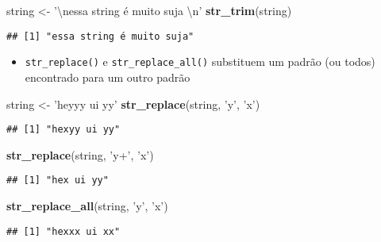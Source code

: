 \documentclass[]{book}
\newenvironment{Shaded}{\begin{snugshade}}{\end{snugshade}}
\newcommand{\KeywordTok}[1]{\textcolor[rgb]{0.13,0.29,0.53}{\textbf{{#1}}}}
\newcommand{\CharTok}[1]{\textcolor[rgb]{0.31,0.60,0.02}{{#1}}}
\newcommand{\StringTok}[1]{\textcolor[rgb]{0.31,0.60,0.02}{{#1}}}
\newcommand{\NormalTok}[1]{{#1}}
\providecommand{\tightlist}{%
  \setlength{\itemsep}{0pt}\setlength{\parskip}{0pt}}
\begin{document}
\begin{Shaded}
\begin{Highlighting}[]
\NormalTok{string <-}\StringTok{ '}\CharTok{\textbackslash{}n}\StringTok{essa string é muito suja       }\CharTok{\textbackslash{}n}\StringTok{'}
\KeywordTok{str_trim}\NormalTok{(string)}
\end{Highlighting}
\end{Shaded}

\begin{verbatim}
## [1] "essa string é muito suja"
\end{verbatim}

\begin{itemize}
\tightlist
\item
  \texttt{str\_replace()} e \texttt{str\_replace\_all()} substituem um
  padrão (ou todos) encontrado para um outro padrão
\end{itemize}

\begin{Shaded}
\begin{Highlighting}[]
\NormalTok{string <-}\StringTok{ 'heyyy ui yy'}
\KeywordTok{str_replace}\NormalTok{(string, }\StringTok{'y'}\NormalTok{, }\StringTok{'x'}\NormalTok{)}
\end{Highlighting}
\end{Shaded}

\begin{verbatim}
## [1] "hexyy ui yy"
\end{verbatim}

\begin{Shaded}
\begin{Highlighting}[]
\KeywordTok{str_replace}\NormalTok{(string, }\StringTok{'y+'}\NormalTok{, }\StringTok{'x'}\NormalTok{)}
\end{Highlighting}
\end{Shaded}

\begin{verbatim}
## [1] "hex ui yy"
\end{verbatim}

\begin{Shaded}
\begin{Highlighting}[]
\KeywordTok{str_replace_all}\NormalTok{(string, }\StringTok{'y'}\NormalTok{, }\StringTok{'x'}\NormalTok{)}
\end{Highlighting}
\end{Shaded}

\begin{verbatim}
## [1] "hexxx ui xx"
\end{verbatim}
\end{document}
